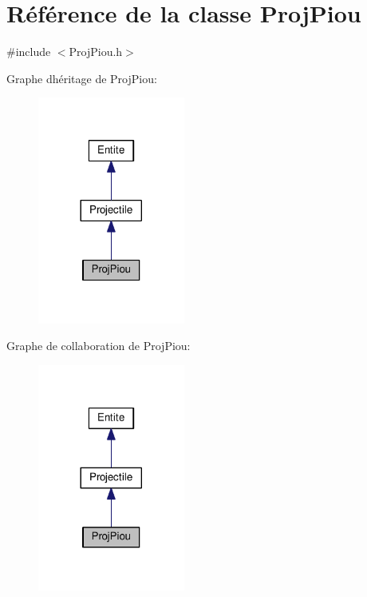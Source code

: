 \hypertarget{class_proj_piou}{}\section{Référence de la classe Proj\+Piou}
\label{class_proj_piou}


{\ttfamily \#include $<$Proj\+Piou.\+h$>$}



Graphe d\textquotesingle{}héritage de Proj\+Piou\+:
\nopagebreak
\begin{figure}[H]
\begin{center}
\leavevmode
\includegraphics[width=137pt]{class_proj_piou__inherit__graph}
\end{center}
\end{figure}


Graphe de collaboration de Proj\+Piou\+:
\nopagebreak
\begin{figure}[H]
\begin{center}
\leavevmode
\includegraphics[width=137pt]{class_proj_piou__coll__graph}
\end{center}
\end{figure}
